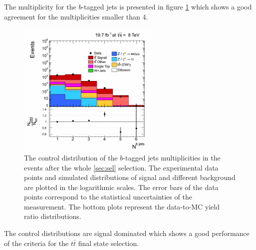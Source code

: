 The multiplicity for the $b$-tagged jets is presented in figure \ref{fig:CPbJetMult} which shows a good agreement for the multiplicities smaller than 4.

 \begin{figure}[h]
  \centering
  \includegraphics[width=0.6\textwidth]{04_event_reconstruction/plots/basic_bjet_multiplicity_step7.png}
  \caption{The control distribution of the $b$-tagged jets multiplicities in the events after the whole \ref{sec:sel} selection. 
  The experimental data points and simulated distributions of signal and different background are plotted in the logarithmic scales. 
  The error bars of the data points correspond to the statistical uncertainties of the measurement. 
  The bottom plots represent the data-to-MC yield ratio distributions.}
  \label{fig:CPbJetMult}
 \end{figure}
 
The control distributions are signal dominated which shows a good performance of the criteria for the $t\bar{t}$ final state selection.